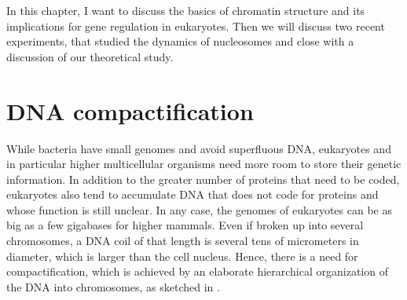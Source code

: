 In this chapter, I want to discuss the basics of chromatin structure and its implications
for gene regulation in eukaryotes. Then we will discuss two recent experiments, that studied the 
dynamics of nucleosomes and close with a discussion of our theoretical study.


\section{DNA compactification}
While bacteria have small genomes and avoid superfluous DNA, eukaryotes and in particular higher
multicellular organisms need more room to store their genetic information. In addition to the  
greater number of proteins that need to be coded, eukaryotes also tend to 
accumulate DNA that does not code for proteins and whose function is still unclear. In any case, 
the genomes of eukaryotes can be as big as a few gigabases for higher mammals. Even if broken 
up into several chromosomes, a DNA coil of that length is several tens of micrometers in diameter,
which is larger than the cell nucleus. Hence, there is a need for compactification, which is achieved
by an elaborate hierarchical organization of the DNA into chromosomes, as sketched in
. 

